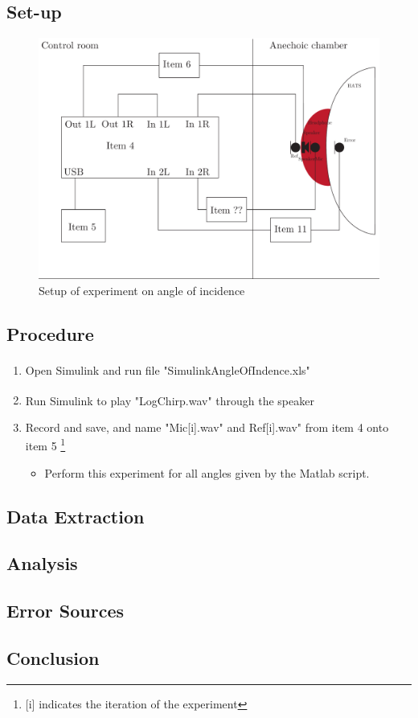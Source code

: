 \subsection{Set-up}
\begin{figure}[H]
	\includegraphics[width=\textwidth]{../Journal/Experiments/AngleOfIncidence/AngleOfIncidenceSetup.pdf}
	\caption{Setup of experiment on angle of incidence}
	\label{Fig:AngleOfIncidenceSetup}
\end{figure}

\subsection{Procedure}
\begin{enumerate}
	\item Open Simulink\textsuperscript{\textregistered} and run file "SimulinkAngleOfIndence.xls"
	\item Run Simulink\textsuperscript{\textregistered} to play "LogChirp.wav" through the speaker
	\item Record and save, and name "Mic[i].wav" and Ref[i].wav" from item 4 onto item 5 \footnote{[i] indicates the iteration of the experiment}
	\begin{itemize}
		\item[] Perform this experiment for all angles given by the Matlab script. 
	\end{itemize}
\end{enumerate}

\subsection{Data Extraction}

\subsection{Analysis}

\subsection{Error Sources}

\subsection{Conclusion}